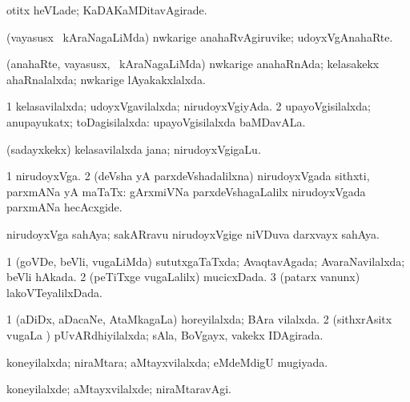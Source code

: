 \bentry
{} 
\gl{\kirxvi}
\expl{}
\bmng
 otitx heVLade; KaDAKaMDitavAgirade. 
\emng
\eentry

\bentry
{} 
\gl{\nA}
\expl{}
\bmng
 (vayasusx \mo\ kAraNagaLiMda) nwkarige anahaRvAgiruvike; udoyxVgAnahaRte. 
\emng
\eentry

\bentry
{} 
\gl{\gu}
\expl{}
\bmng
 (anahaRte, vayasusx, \mo\ kAraNagaLiMda) nwkarige anahaRnAda; kelasakekx ahaRnalalxda; nwkarige lAyakakxlalxda. 
\emng
\eentry

\bentry
{} 
\gl{\gu}
\expl{}
\bmng
\bnum
\num{1} kelasavilalxda; udoyxVgavilalxda; nirudoyxVgiyAda. 
\num{2} upayoVgisilalxda; anupayukatx; toDagisilalxda:  upayoVgisilalxda baMDavALa. 
\enum
\emng

\noindent
\gl{\pagu}
\expl{}
\bmng
  (sadayxkekx) kelasavilalxda jana; nirudoyxVgigaLu. 
\emng
\eentry

\bentry
{} 
\gl{\nA}
\expl{}
\bmng
\bnum
\num{1} nirudoyxVga. 
\num{2} (deVsha yA parxdeVshadalilxna) nirudoyxVgada sithxti, parxmANa yA maTaTx:  gArxmiVNa parxdeVshagaLalilx nirudoyxVgada parxmANa hecAcxgide. 
\enum
\emng
\eentry


\bentry 
{}
\gl{\nA}
\expl{}
\bmng
 nirudoyxVga sahAya; sakARravu nirudoyxVgige niVDuva darxvayx sahAya. 
\emng
\eentry

\bentry
{} 
\gl{\gu}
\expl{}
\bmng
\bnum
\num{1} (goVDe, beVli, \mo vugaLiMda) sututxgaTaTxda; AvaqtavAgada; AvaraNavilalxda; beVli hAkada. 
\num{2} (peTiTxge \mo vugaLalilx) mucicxDada. 
\num{3} (patarx \mo vanunx) lakoVTeyalilxDada. 
\enum
\emng
\eentry

\bentry
{} 
\gl{\gu}
\expl{}
\bmng
\bnum
\num{1} (aDiDx, aDacaNe, AtaMkagaLa) horeyilalxda; BAra vilalxda. 
\num{2} (sithxrAsitx \mo vugaLa \vi) pUvARdhiyilalxda; sAla, BoVgayx, \mo vakekx IDAgirada. 
\enum
\emng
\eentry

\bentry
{} 
\gl{\gu}
\bmng
 koneyilalxda; niraMtara; aMtayxvilalxda; eMdeMdigU mugiyada. 
\emng
\eentry

\bentry
{} 
\gl{\kirxvi}
\expl{}
\bmng
 koneyilalxde; aMtayxvilalxde; niraMtaravAgi. 
\emng
\eentry

